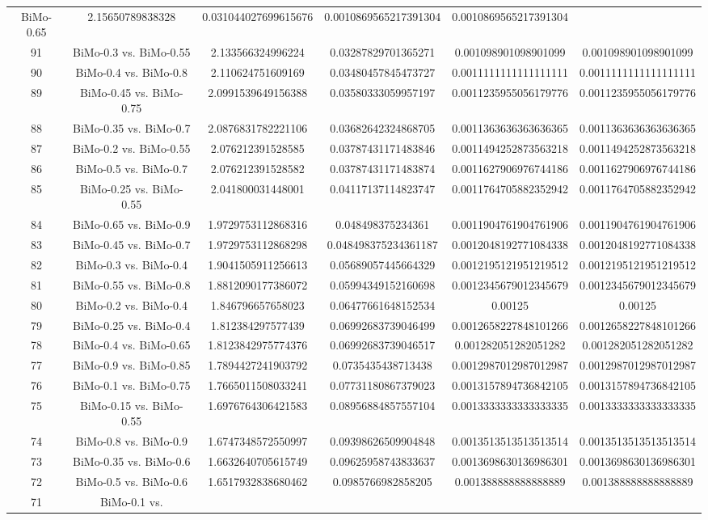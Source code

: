 \documentclass[a4paper,10pt]{article}
\begin{document}
\begin{landscape}
\begin{table}[!htp]
\begin{tabular}{cccccc}
BiMo-0.65&2.15650789838328&0.031044027699615676&0.0010869565217391304&0.0010869565217391304\\91&BiMo-0.3 vs. BiMo-0.55&2.133566324996224&0.03287829701365271&0.001098901098901099&0.001098901098901099\\90&BiMo-0.4 vs. BiMo-0.8&2.110624751609169&0.03480457845473727&0.0011111111111111111&0.0011111111111111111\\89&BiMo-0.45 vs. BiMo-0.75&2.0991539649156388&0.03580333059957197&0.0011235955056179776&0.0011235955056179776\\88&BiMo-0.35 vs. BiMo-0.7&2.0876831782221106&0.03682642324868705&0.0011363636363636365&0.0011363636363636365\\87&BiMo-0.2 vs. BiMo-0.55&2.076212391528585&0.03787431171483846&0.0011494252873563218&0.0011494252873563218\\86&BiMo-0.5 vs. BiMo-0.7&2.076212391528582&0.03787431171483874&0.0011627906976744186&0.0011627906976744186\\85&BiMo-0.25 vs. BiMo-0.55&2.041800031448001&0.04117137114823747&0.0011764705882352942&0.0011764705882352942\\84&BiMo-0.65 vs. BiMo-0.9&1.9729753112868316&0.048498375234361&0.0011904761904761906&0.0011904761904761906\\83&BiMo-0.45 vs. BiMo-0.7&1.9729753112868298&0.048498375234361187&0.0012048192771084338&0.0012048192771084338\\82&BiMo-0.3 vs. BiMo-0.4&1.9041505911256613&0.05689057445664329&0.0012195121951219512&0.0012195121951219512\\81&BiMo-0.55 vs. BiMo-0.8&1.8812090177386072&0.05994349152160698&0.0012345679012345679&0.0012345679012345679\\80&BiMo-0.2 vs. BiMo-0.4&1.846796657658023&0.06477661648152534&0.00125&0.00125\\79&BiMo-0.25 vs. BiMo-0.4&1.812384297577439&0.06992683739046499&0.0012658227848101266&0.0012658227848101266\\78&BiMo-0.4 vs. BiMo-0.65&1.8123842975774376&0.06992683739046517&0.001282051282051282&0.001282051282051282\\77&BiMo-0.9 vs. BiMo-0.85&1.7894427241903792&0.0735435438713438&0.0012987012987012987&0.0012987012987012987\\76&BiMo-0.1 vs. BiMo-0.75&1.7665011508033241&0.07731180867379023&0.0013157894736842105&0.0013157894736842105\\75&BiMo-0.15 vs. BiMo-0.55&1.6976764306421583&0.08956884857557104&0.0013333333333333335&0.0013333333333333335\\74&BiMo-0.8 vs. BiMo-0.9&1.6747348572550997&0.09398626509904848&0.0013513513513513514&0.0013513513513513514\\73&BiMo-0.35 vs. BiMo-0.6&1.6632640705615749&0.09625958743833637&0.0013698630136986301&0.0013698630136986301\\72&BiMo-0.5 vs. BiMo-0.6&1.6517932838680462&0.0985766982858205&0.001388888888888889&0.001388888888888889\\71&BiMo-0.1 vs. 
\end{tabular}
\end{table}
\end{landscape}
\end{document}

